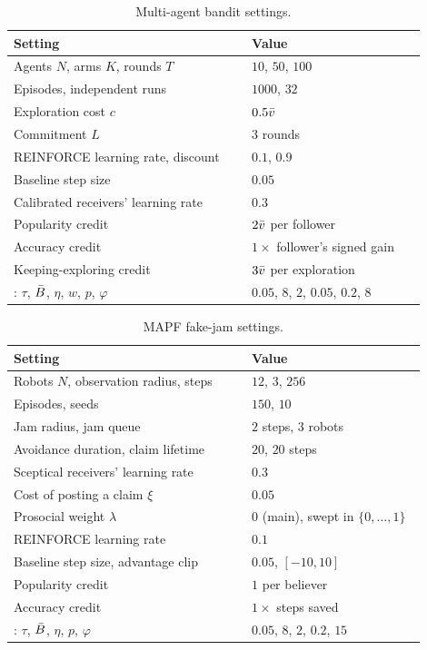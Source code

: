 \begin{table}[t]
  \caption{Multi-agent bandit settings.}
  \label{tab:hyper-bandit}
  \centering
  \small
  \begin{tabular}{p{0.52\linewidth}p{0.38\linewidth}}
    \toprule
    Setting & Value \\
    \midrule
    Agents $N$, arms $K$, rounds $T$ & $10$, $50$, $100$ \\
    Episodes, independent runs & $1000$, $32$ \\
    Exploration cost $c$ & $0.5\bar v$ \\
    Commitment $L$ & $3$ rounds \\
    REINFORCE learning rate, discount & $0.1$, $0.9$ \\
    Baseline step size & $0.05$ \\
    Calibrated receivers' learning rate & $0.3$ \\
    Popularity credit & $2\bar v$ per follower \\
    Accuracy credit & $1\times$ follower's signed gain \\
    Keeping-exploring credit & $3\bar v$ per exploration \\
    \tvc{}: $\tau$, $\bar B$, $\eta$, $w$, $p$, $\varphi$ & $0.05$, $8$, $2$, $0.05$, $0.2$, $8$ \\
    \bottomrule
  \end{tabular}
\end{table}

\begin{table}[t]
  \caption{MAPF fake-jam settings.}
  \label{tab:hyper-jams}
  \centering
  \small
  \begin{tabular}{p{0.52\linewidth}p{0.38\linewidth}}
    \toprule
    Setting & Value \\
    \midrule
    Robots $N$, observation radius, steps & $12$, $3$, $256$ \\
    Episodes, seeds & $150$, $10$ \\
    Jam radius, jam queue & $2$ steps, $3$ robots \\
    Avoidance duration, claim lifetime & $20$, $20$ steps \\
    Sceptical receivers' learning rate & $0.3$ \\
    Cost of posting a claim $\xi$ & $0.05$ \\
    Prosocial weight $\lambda$ & $0$ (main), swept in $\{0,\dots,1\}$ \\
    REINFORCE learning rate & $0.1$ \\
    Baseline step size, advantage clip & $0.05$, $[-10,10]$ \\
    Popularity credit & $1$ per believer \\
    Accuracy credit & $1\times$ steps saved \\
    \tvc{}: $\tau$, $\bar B$, $\eta$, $p$, $\varphi$ & $0.05$, $8$, $2$, $0.2$, $15$ \\
    \bottomrule
  \end{tabular}
\end{table}

